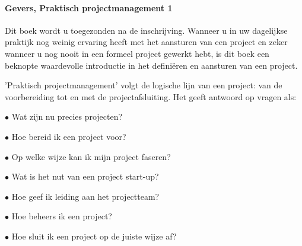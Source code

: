 \paragraph{Gevers, Praktisch projectmanagement 1} Dit boek wordt u toegezonden
na de inschrijving. Wanneer u in uw dagelijkse praktijk nog weinig ervaring heeft met het
aansturen van een project en zeker wanneer u nog nooit in een formeel project
gewerkt hebt, is dit boek een beknopte waardevolle introductie in het definiëren
en aansturen van een project.

'Praktisch projectmanagement' volgt de logische lijn van een project:
van de voorbereiding tot en met de projectafsluiting. Het geeft antwoord op
vragen als:
\par $\bullet$ Wat zijn nu precies projecten?

$\bullet$ Hoe bereid ik een project voor?

$\bullet$ Op welke wijze kan ik mijn project faseren?

$\bullet$ Wat is het nut van een project start-up?

$\bullet$ Hoe geef ik leiding aan het projectteam?

$\bullet$ Hoe beheers ik een project?

$\bullet$ Hoe sluit ik een project op de juiste wijze af?

